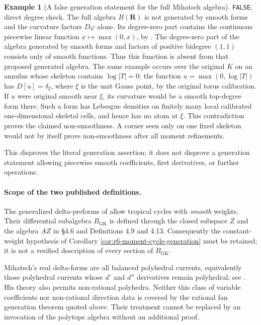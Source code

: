 \documentclass[11pt,a4paper]{article}
\numberwithin{equation}{section}
\theoremstyle{definition}
\newtheorem{example}[theorem]{Example}
\theoremstyle{remark}
\begin{document}
\begin{example}[A false generation statement for the full Mihatsch algebra]
\label{ex:r6-smooth-generation-false}
\textnormal{\texttt{FALSE}; direct degree check.}
The full algebra $B(\mathbf R)$ is not generated by smooth forms
and the curvature factors $D\varphi$ alone.  Its degree-zero part
contains the continuous piecewise linear function
$x\mapsto\max(0,x)$, by \cite[Lemma 3.7]{Mih23}.  The degree-zero
part of the algebra generated by smooth forms and factors of
positive bidegree $(1,1)$ consists only of smooth functions.
Thus this function is absent from that proposed generated algebra.
The same example occurs over the original $K$ on an annulus whose
skeleton contains $\log|T|=0$: the function
$u=\max(0,\log|T|)$ has $D[u]=\delta_\xi$, where $\xi$ is the
unit Gauss point, by the original torus calibration.  If $u$ were
original smooth near $\xi$, its curvature would be a smooth
top-degree form there.  Such a form has Lebesgue densities on
finitely many local calibrated one-dimensional skeletal cells,
and hence has no atom at $\xi$.  This contradiction proves the
claimed non-smoothness.  A corner seen only on one fixed skeleton
would not by itself prove non-smoothness after all moment refinements.

This disproves the literal generation assertion; it does not
disprove a generation statement allowing piecewise smooth
coefficients, first derivatives, or further operations.
\end{example}

\paragraph{Scope of the two published definitions.}
The generalized delta-preforms of \cite[Definition 2.9]{GK17}
allow tropical cycles with \emph{smooth} weights.  Their differential
subalgebra $B_{\mathrm{GK}}$ is defined through the closed subspace
$Z$ and the algebra $AZ$ in \S4.6 and Definitions 4.9 and 4.13.
Consequently the constant-weight hypothesis of
Corollary \ref{cor:r6-moment-cycle-generation} must be retained;
it is not a verified description of every section of
$B_{\mathrm{GK}}$.

Mihatsch's real delta-forms are all balanced polyhedral currents,
equivalently those polyhedral currents whose $d'$ and $d''$
derivatives remain polyhedral; see \cite[Definitions 3.1--3.2 and
Theorem 3.3]{Mih23}.  His theory also permits non-rational
polyhedra.  Neither this class of variable coefficients nor
non-rational direction data is covered by the rational fan
generation theorem quoted above.  Their treatment cannot be
replaced by an invocation of the polytope algebra without an
additional proof.
\end{document}
